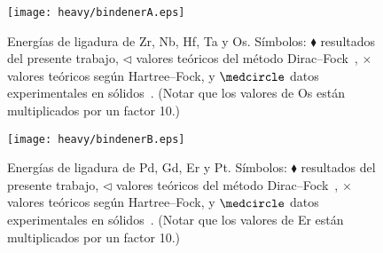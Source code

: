 \begin{figure}
\centering
\texttt{[image: heavy/bindenerA.eps]} 
\caption[Energías de ligadura de blancos pesados]
{Energías de ligadura de Zr, Nb, Hf, Ta y Os. Símbolos: 
$\blacklozenge$ resultados del presente trabajo, 
$\triangleleft$ valores teóricos del método 
Dirac--Fock~\cite{Desclaux:73}, $\times$ valores teóricos según 
Hartree--Fock, y $\medcircle$ datos experimentales en 
sólidos~\cite{Williams:95}. (Notar que los valores de Os están 
multiplicados por un factor 10.)}
\label{fig:bindenerA}
\end{figure}

\begin{figure}
\centering
\texttt{[image: heavy/bindenerB.eps]} 
\caption[Energías de ligadura de blancos pesados]
{Energías de ligadura de Pd, Gd, Er y Pt. Símbolos: $\blacklozenge$ 
resultados del presente trabajo, $\triangleleft$ valores 
teóricos del método Dirac--Fock~\cite{Desclaux:73}, $\times$ valores 
teóricos según Hartree--Fock, y $\medcircle$ datos experimentales en 
sólidos~\cite{Williams:95}. (Notar que los valores de Er están 
multiplicados por un factor 10.)}
\label{fig:bindenerB}
\end{figure}

